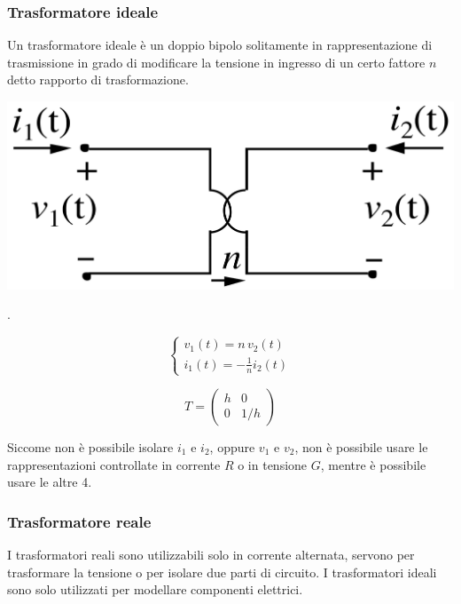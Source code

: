 \documentclass[a4paper]{article}
\begin{document}
\subsubsection*{Trasformatore ideale}
Un trasformatore ideale è un doppio bipolo solitamente in rappresentazione di trasmissione in grado di modificare la tensione
in ingresso di un certo fattore \(n\) detto rapporto di trasformazione.

\begin{center}
	\begin{minipage}{0.3\textwidth}
		\centering
		\includegraphics[width=\textwidth]{trasformatore.png}
	\end{minipage}
	\begin{minipage}{0.07\textwidth}
		\(\big.\)
	\end{minipage}
	\begin{minipage}{0.3\textwidth}
		\[\begin{cases}
			\displaystyle v_1(t) = n \, v_2(t) \\[7pt]
			\displaystyle i_1(t) = -\frac{1}{n} i_2(t)
		\end{cases}\]
	\end{minipage}
	\begin{minipage}{0.25\textwidth}
		\[T = \left(\begin{matrix}
			h & 0 \\ 0 & 1/h
		\end{matrix}\right)\]
	\end{minipage}
\end{center}
Siccome non è possibile isolare \(i_1\) e \(i_2\), oppure \(v_1\) e \(v_2\), non è possibile usare le rappresentazioni controllate
in corrente \(R\) o in tensione \(G\), mentre è possibile usare le altre 4.

\subsubsection*{Trasformatore reale}
I trasformatori reali sono utilizzabili solo in corrente alternata, servono per trasformare la tensione o per isolare due parti
di circuito. I trasformatori ideali sono solo utilizzati per modellare componenti elettrici.
\end{document}
